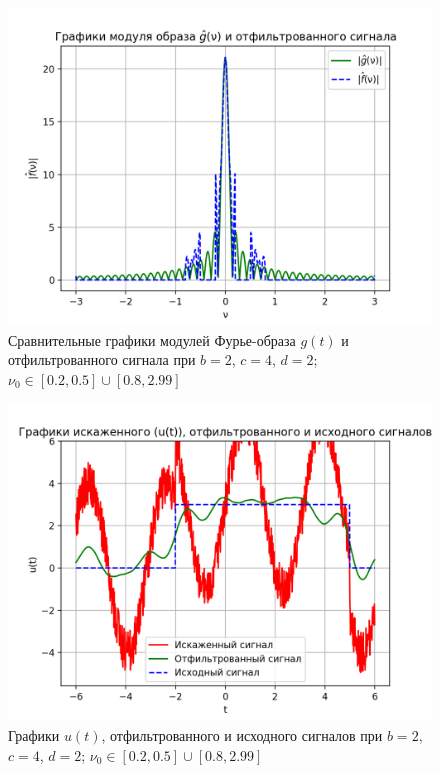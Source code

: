 \begin{figure}[ht!]
    \centering
    \includegraphics[scale=0.55]{media/1 task/specific_freq/Fourier_Image_Comparison_2_4_2_-0,5_-0,2_-2,99_-0,8.png}
    \caption{Сравнительные графики модулей Фурье-образа $g(t)$ и отфильтрованного сигнала при $b=2$, $c=4$, $d=2$; $\nu_0 \in [0.2, 0.5] \cup [0.8, 2.99]$}
    \label{fig:fourc_2_4_2_1}
\end{figure}

\begin{figure}[ht!]
    \centering
    \includegraphics[scale=0.65]{media/1 task/specific_freq/Cleaned_2_4_2_-0,5_-0,2_-2,99_-0,8.png}
    \caption{Графики  $u(t)$, отфильтрованного и исходного сигналов при $b=2$, $c=4$, $d=2$; $\nu_0 \in [0.2, 0.5] \cup [0.8, 2.99]$}
    \label{fig:cleaned_2_4_2_1}
\end{figure}


